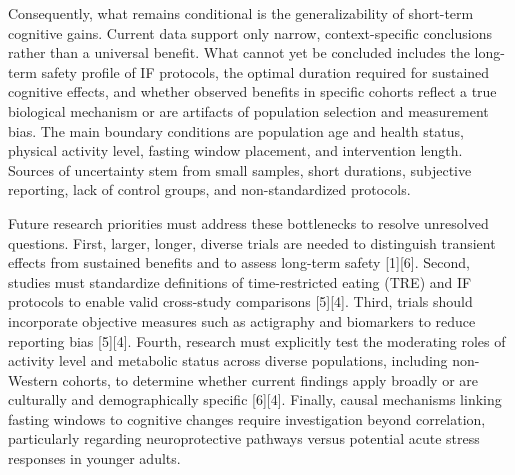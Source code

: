 \documentclass[conference]{IEEEtran}
\begin{document}
Consequently, what remains conditional is the generalizability of short-term cognitive gains. Current data support only narrow, context-specific conclusions rather than a universal benefit. What cannot yet be concluded includes the long-term safety profile of IF protocols, the optimal duration required for sustained cognitive effects, and whether observed benefits in specific cohorts reflect a true biological mechanism or are artifacts of population selection and measurement bias. The main boundary conditions are population age and health status, physical activity level, fasting window placement, and intervention length. Sources of uncertainty stem from small samples, short durations, subjective reporting, lack of control groups, and non-standardized protocols.

Future research priorities must address these bottlenecks to resolve unresolved questions. First, larger, longer, diverse trials are needed to distinguish transient effects from sustained benefits and to assess long-term safety [1][6]. Second, studies must standardize definitions of time-restricted eating (TRE) and IF protocols to enable valid cross-study comparisons [5][4]. Third, trials should incorporate objective measures such as actigraphy and biomarkers to reduce reporting bias [5][4]. Fourth, research must explicitly test the moderating roles of activity level and metabolic status across diverse populations, including non-Western cohorts, to determine whether current findings apply broadly or are culturally and demographically specific [6][4]. Finally, causal mechanisms linking fasting windows to cognitive changes require investigation beyond correlation, particularly regarding neuroprotective pathways versus potential acute stress responses in younger adults.
\end{document}
